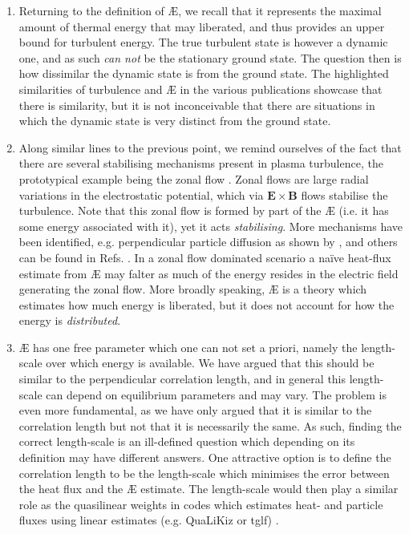 \begin{enumerate}
    \item Returning to the definition of \AE{}, we recall that it represents the maximal amount of thermal energy that may liberated, and thus provides an upper bound for turbulent energy. The true turbulent state is however a dynamic one, and as such {\it can not} be the stationary ground state. The question then is how dissimilar the dynamic state is from the ground state. The highlighted similarities of turbulence and \AE{} in the various publications showcase that there is similarity, but it is not inconceivable that there are situations in which the dynamic state is very distinct from the ground state. 
    \item Along similar lines to the previous point, we remind ourselves of the fact that there are several stabilising mechanisms present in plasma turbulence, the prototypical example being the zonal flow \cite{diamond2005zonal,itoh2006physics,fujisawa2008review}. Zonal flows are large radial variations in the electrostatic potential, which via $\boldsymbol{E}\times \boldsymbol{B}$ flows stabilise the turbulence. Note that this zonal flow is formed by part of the \AE{} (i.e. it has some energy associated with it), yet it acts {\it stabilising}. More mechanisms have been identified, e.g. perpendicular particle diffusion as shown by \citet{merz2008nonlinear}, and others can be found in Refs. \cite{terry2015overview,pueschel2016stellarator,hegna2018theory,faber2018stellarator}. In a zonal flow dominated scenario a na\"ive heat-flux estimate from \AE{} may falter as much of the energy resides in the electric field generating the zonal flow. More broadly speaking, \AE{} is a theory which estimates how much energy is liberated, but it does not account for how the energy is {\it distributed}. 
    \item \AE{} has one free parameter which one can not set a priori, namely the length-scale over which energy is available. We have argued that this should be similar to the perpendicular correlation length, and in general this length-scale can depend on equilibrium parameters and may vary. The problem is even more fundamental, as we have only argued that it is similar to the correlation length but not that it is necessarily the same. As such, finding the correct length-scale is an ill-defined question which depending on its definition may have different answers. One attractive option is to define the correlation length to be the length-scale which minimises the error between the heat flux and the \AE{} estimate. The length-scale would then play a similar role as the quasilinear weights in codes which estimates heat- and particle fluxes using linear estimates (e.g. QuaLiKiz or {\sc tglf}) \cite{staebler2007theory,casati2009validating,citrin2012quasilinear,staebler2021verification}.
\end{enumerate}
